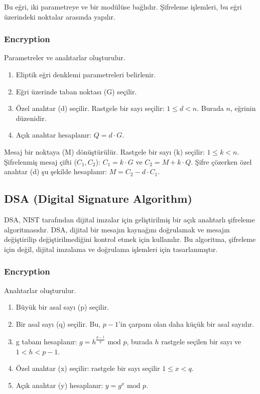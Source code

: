 Bu eğri, iki parametreye ve bir modülüse bağlıdır. Şifreleme işlemleri, bu eğri üzerindeki noktalar arasında yapılır.

\subsubsection{Encryption}

Parametreler ve anahtarlar oluşturulur.

\begin{enumerate}
    \item Eliptik eğri denklemi parametreleri belirlenir.
    \item Eğri üzerinde taban noktası (G) seçilir.
    \item Özel anahtar (d) seçilir. Rastgele bir sayı seçilir: $1 \leq d < n$. Burada $n$, eğrinin düzenidir.
    \item Açık anahtar hesaplanır: $Q = d \cdot G$.
\end{enumerate}

Mesaj bir noktaya (M) dönüştürülür. Rastgele bir sayı (k) seçilir: $1 \leq k < n$. Şifrelenmiş mesaj çifti ($C_1, C_2$): $C_1 = k \cdot G$ ve $C_2 = M + k \cdot Q$. Şifre çözerken özel anahtar (d) şu şekilde hesaplanır: $M = C_2 - d \cdot C_1$.

\newpage

\subsection{DSA (Digital Signature Algorithm)}

DSA, NIST tarafından dijital imzalar için geliştirilmiş bir açık anahtarlı şifreleme algoritmasıdır. DSA, dijital bir mesajın kaynağını doğrulamak ve mesajın değiştirilip değiştirilmediğini kontrol etmek için kullanılır. Bu algoritma, şifreleme için değil, dijital imzalama ve doğrulama işlemleri için tasarlanmıştır.

\subsubsection{Encryption}

Anahtarlar oluşturulur.

\begin{enumerate}
    \item Büyük bir asal sayı (p) seçilir.
    \item Bir asal sayı (q) seçilir. Bu, $p - 1$'in çarpanı olan daha küçük bir asal sayıdır.
    \item g tabanı hesaplanır: $g = h^{\frac{p - 1}{q}} \text{ mod } p$, burada $h$ rastgele seçilen bir sayı ve $1 < h < p - 1$.
    \item Özel anahtar (x) seçilir: rastgele bir sayı seçilir $1 \leq x < q$.
    \item Açık anahtar (y) hesaplanır: $y = g^x \text{ mod } p$.
\end{enumerate}

